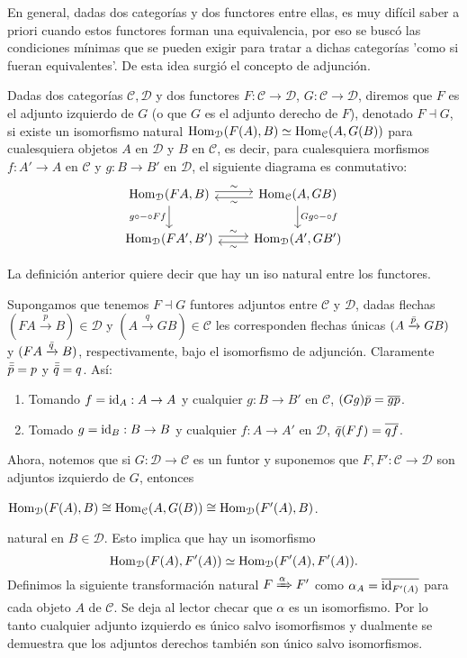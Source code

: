 \documentclass{comunicaciones}
\begin{document}
En general, dadas dos categorías y dos functores entre ellas, es muy difícil saber a priori cuando estos functores forman una equivalencia, por eso se buscó las condiciones mínimas que se pueden exigir para tratar a dichas categorías 'como si fueran equivalentes'. De esta idea surgió el concepto de adjunción.
\begin{dfn}
	Dadas dos categorías $\mathcal{C,D}$ y dos functores $F:\mathcal{C\to D}$, $G:\mathcal{C\to D}$, diremos que $F$ es el adjunto izquierdo de $G$ (o que $G$ es el adjunto derecho de $F$), denotado $F\dashv G$, si existe un isomorfismo natural $\mathrm{Hom}_\mathcal{D}(F(A),B)\simeq \mathrm{Hom}_\mathcal{C}(A,G(B))$ para cualesquiera objetos $A$ en $\mathcal{D}$ y $B$ en $\mathcal{C}$, es decir, para cualesquiera morfismos $f:A'\to A$
	en $\mathcal C$ y $g:B\to B'$ en $\mathcal D$,
	el siguiente diagrama es conmutativo:
	\[
	\begin{tikzcd}
		\Hom_\mathcal{D}(FA,B)
		\ar[d,"g\circ-\circ Ff"']
		\ar[r,"\sim",shift left]
		& \Hom_\mathcal{C}(A,GB) 
		\ar[d,"Gg\circ-\circ f"]
		\ar[l,"\sim",shift left] \\
		\Hom_\mathcal{D}(FA',B')
		\ar[r,"\sim",shift left]
		& \Hom_\mathcal{D}(A',GB')
		\ar[l,"\sim",shift left]
	\end{tikzcd}
	\]
\end{dfn}
La definición anterior quiere decir que hay un iso natural entre los functores.

\begin{obs}\label{adjcomp}
	Supongamos que tenemos $F\dashv G$ funtores adjuntos entre $\mathcal{C}$ y $\mathcal{D}$, dadas flechas $(FA\xrightarrow p B)\in\mathcal{D}$ y $(A\xrightarrow q GB)\in\mathcal{C}$ les corresponden flechas únicas $(A\xrightarrow{\Bar{p}}GB)$	y $(FA\xrightarrow{\Bar{q}}B)$,
	respectivamente, bajo el isomorfismo de adjunción. Claramente $\Bar{\Bar{p}}=p$ y $\Bar{\Bar{q}}=q$. As\'i:
	\begin{enumerate}
		\item
		Tomando $f=\mathrm{id}_A:A\to A$ y cualquier $g:B\to B'$ en $\mathcal{C}$, $(Gg)\bar p=\overline{gp}$.
		\item
		Tomado $g=\mathrm{id}_B:B\to B$ y cualquier $f:A\to A'$ en $\mathcal{D}$, $\bar q(Ff)=\overline{qf}$.
	\end{enumerate}
\end{obs}

Ahora, notemos que si $G: \mathcal{D} \longrightarrow  \mathcal{C}$ es un funtor y suponemos que  $F,F': \mathcal{C} \longrightarrow  \mathcal{D}$ son adjuntos izquierdo de $G$, entonces 
\begin{center}
	$\mathrm{Hom}_\mathcal{D}(F(A),B)\cong \mathrm{Hom}_\mathcal{C}(A,G(B)) \cong \mathrm{Hom}_\mathcal{D}(F'(A),B)$.
\end{center}
natural en $B \in \mathcal{D}$. Esto implica que hay un isomorfismo 
\[\mathrm{Hom}_\mathcal{D}(F(A),F'(A))\simeq \mathrm{Hom}_\mathcal{D}(F'(A),F'(A)).\]
Definimos la siguiente transformaci\'on natural $F\xRightarrow{\alpha}F'$ como $\alpha_A=\overline{\mathrm{id}_{F'(A)}}$ para cada objeto $A$ de $\mathcal{C}$. Se deja al lector checar que $\alpha$ es un isomorfismo. Por lo tanto cualquier adjunto izquierdo es único salvo isomorfismos y dualmente se demuestra que los adjuntos derechos también son único salvo isomorfismos.
\end{document}

